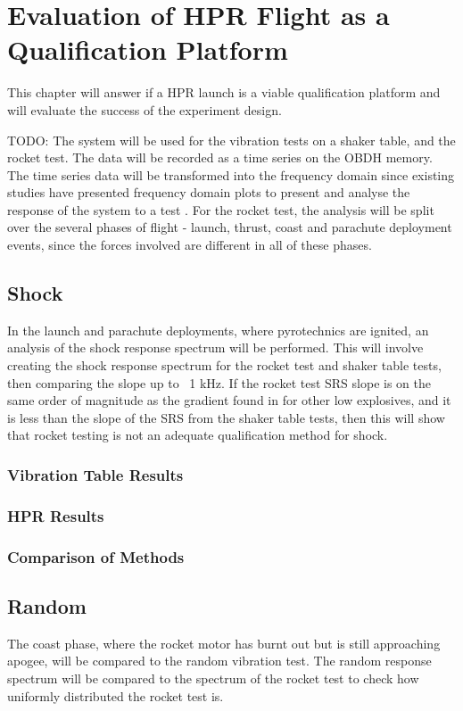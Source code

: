 \documentclass{report}
\begin{document}
\chapter{Evaluation of HPR Flight as a Qualification Platform}

This chapter will answer if a HPR launch is a viable qualification platform and will evaluate the success of the experiment design.

TODO:
The system will be used for the vibration tests on a shaker table, and the rocket test. The data will be recorded as a time series on the OBDH memory. The time series data will be transformed into the frequency domain since existing studies have presented frequency domain plots to present and analyse the response of the system to a test \cite{nasa-pyroshock,nieto2019cubesat}. For the rocket test, the analysis will be split over the several phases of flight - launch, thrust, coast and parachute deployment events, since the forces involved are different in all of these phases.

\section{Shock}
In the launch and parachute deployments, where pyrotechnics are ignited, an analysis of the shock response spectrum will be performed. This will involve creating the shock response spectrum for the rocket test and shaker table tests, then comparing the slope up to ~1 kHz. If the rocket test SRS slope is on the same order of magnitude as the gradient found in \cite{wang2023numerical} for other low explosives, and it is less than the slope of the SRS from the shaker table tests, then this will show that rocket testing is not an adequate qualification method for shock.
\subsection{Vibration Table Results}
\subsection{HPR Results}
\subsection{Comparison of Methods}

\section{Random}
The coast phase, where the rocket motor has burnt out but is still approaching apogee, will be compared to the random vibration test. The random response spectrum will be compared to the spectrum of the rocket test to check how uniformly distributed the rocket test is.
\end{document}

